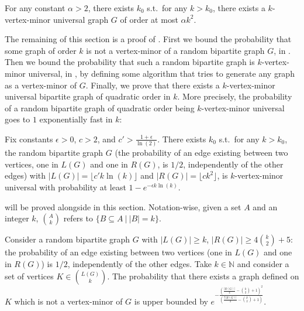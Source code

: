 \documentclass[a4paper,UKenglish,cleveref, autoref, thm-restate]{arxiv}
\newcommand{\se}{\subseteq}
\newcommand{\gs}{\geqslant}
\begin{document}
\begin{theorem}
    For any constant $\alpha>2$, there exists $k_0$ s.t.~for any $k>k_0$, there exists a $k$-vertex-minor universal graph $G$ of order at most $\alpha k^2$.
    \label{thm:existence_vmu}
\end{theorem}

The remaining of this section is a proof of . First we bound the probability that some graph of order $k$ is not a vertex-minor of a random bipartite graph $G$, in . Then we bound the probability that such a random bipartite graph is $k$-vertex-minor universal, in , by defining some algorithm that tries to generate any graph as a vertex-minor of $G$. Finally, we prove that there exists a $k$-vertex-minor universal bipartite graph of quadratic order in $k$. More precisely, the probability of a random bipartite graph of quadratic order being $k$-vertex-minor universal goes to $1$ exponentially fast in $k$:

\begin{proposition}
    Fix constants $\epsilon > 0$, $c>2$, and $c'>  \frac{1+\epsilon}{\ln(2)}$. There exists $k_0$ s.t.~for any $k>k_0$, the random bipartite graph $G$ (the probability of an edge existing between two vertices, one in $L(G)$ and one in $R(G)$, is $1/2$, independently of the other edges) with $|L(G)|= \lfloor c'k\ln(k) \rfloor$ and $|R(G)| = \lfloor c k^2 \rfloor$, is $k$-vertex-minor universal with probability at least $1 - e^{-\epsilon k \ln(k)}$. 
    \label{prop:proba_exp_vmu}
\end{proposition}

 will be proved alongside  in this section. Notation-wise, given a set $A$ and an integer $k$, ${A \choose k}$ refers to $\{B \se A ~|~|B|=k\}$.

\begin{lemma}
    \label{lemma:proba_full_rank}
    Consider a random bipartite graph $G$ with $|L(G)|\gs k$, $|R(G)| \gs 4{k \choose 2}+5$: the probability of an edge existing between two vertices (one in $L(G)$ and one in $R(G)$) is $1/2$, independently of the other edges. Take $k \in \mathbb{N}$ and consider a set of vertices $K \in {L(G) \choose k}$. The probability that there exists a graph defined on $K$ which is not a vertex-minor of $G$ is upper bounded by $e^{-\frac{\left(\frac{|R(G)|}{4}-{k \choose 2}+1\right)^2}{\left(\frac{7|R(G)|}{4}-{k \choose 2}+1\right)}}$.
\end{lemma}
\end{document}

